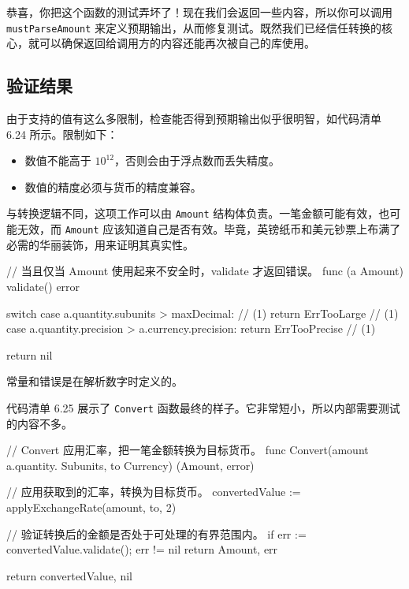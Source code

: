 恭喜，你把这个函数的测试弄坏了！现在我们会返回一些内容，所以你可以调用 \texttt{mustParseAmount} 来定义预期输出，从而修复测试。既然我们已经信任转换的核心，就可以确保返回给调用方的内容还能再次被自己的库使用。

\subsection{验证结果}

由于支持的值有这么多限制，检查能否得到预期输出似乎很明智，如代码清单 6.24 所示。限制如下：

\begin{itemize}
\item 数值不能高于 $10^{12}$，否则会由于浮点数而丢失精度。
\item 数值的精度必须与货币的精度兼容。
\end{itemize}

与转换逻辑不同，这项工作可以由 \texttt{Amount} 结构体负责。一笔金额可能有效，也可能无效，而 \texttt{Amount} 应该知道自己是否有效。毕竟，英镑纸币和美元钞票上布满了必需的华丽装饰，用来证明其真实性。

\begin{gocode}[title={代码清单 6.24 \texttt{amount.go}：\texttt{validate} 方法的实现}]
// 当且仅当 Amount 使用起来不安全时，validate 才返回错误。
func (a Amount) validate() error {
    switch {
    case a.quantity.subunits > maxDecimal: // (1)
        return ErrTooLarge // (1)
    case a.quantity.precision > a.currency.precision:
        return ErrTooPrecise // (1)
    }

    return nil
}
\end{gocode}

\begin{codeannotations}
\item 常量和错误是在解析数字时定义的。
\end{codeannotations}

代码清单 6.25 展示了 \texttt{Convert} 函数最终的样子。它非常短小，所以内部需要测试的内容不多。

\begin{gocode}[title={代码清单 6.25 \texttt{convert.go}：\texttt{Convert} 的实现}]
// Convert 应用汇率，把一笔金额转换为目标货币。
func Convert(amount a.quantity. Subunits, to Currency) (Amount, error) {
    // 应用获取到的汇率，转换为目标货币。
    convertedValue := applyExchangeRate(amount, to, 2)

    // 验证转换后的金额是否处于可处理的有界范围内。
    if err := convertedValue.validate(); err != nil {
        return Amount{}, err
    }

    return convertedValue, nil
}
\end{gocode}

